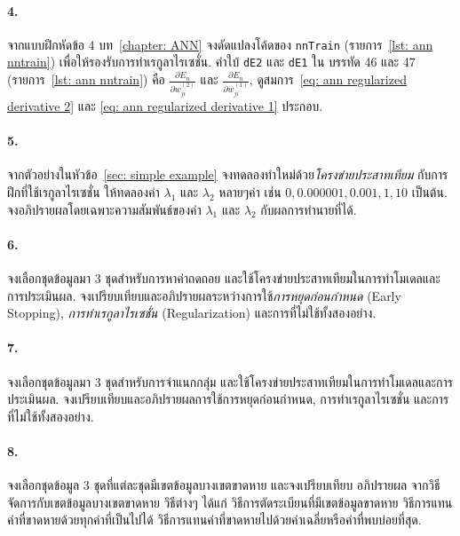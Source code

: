 \paragraph{4.}
จากแบบฝึกหัดข้อ 4 บท~\ref{chapter: ANN} จงดัดแปลงโค้ดของ \texttt{nnTrain} (รายการ~\ref{lst: ann nntrain}) เพื่อให้รองรับการทำเรกูลาไรเซชั่น.
คำใบ้ \texttt{dE2} และ \texttt{dE1} ใน บรรทัด 46 และ 47 (รายการ~\ref{lst: ann nntrain}) คือ $\frac{\partial E_n}{\partial w_{ji}^{(2)}}$ และ $\frac{\partial E_n}{\partial w_{ji}^{(1)}}$, ดูสมการ~\ref{eq: ann regularized derivative 2} และ \ref{eq: ann regularized derivative 1} ประกอบ.

\paragraph{5.}
จากตัวอย่างในหัวข้อ~\ref{sec: simple example} จงทดลองทำใหม่ด้วย\textit{โครงข่ายประสาทเทียม}%
กับการฝึกที่ใช้เรกูลาไรเซชั่น ให้ทดลองค่า $\lambda_1$ และ $\lambda_2$ หลายๆค่า เช่น $0, 0.000001, 0.001, 1, 10$ เป็นต้น.
จงอภิปรายผลโดยเฉพาะความสัมพันธ์ของค่า $\lambda_1$ และ $\lambda_2$ กับผลการทำนายที่ได้.

\paragraph{6.} 
จงเลือกชุดข้อมูลมา $3$ ชุดสำหรับการหาค่าถดถอย 
และใช้โครงข่ายประสาทเทียมในการทำโมเดลและการประเมินผล.
จงเปรียบเทียบและอภิปรายผลระหว่างการใช้\textit{การหยุดก่อนกำหนด} (Early Stopping), \textit{การทำเรกูลาไรเซชั่น} (Regularization) และการที่ไม่ใช้ทั้งสองอย่าง.

\paragraph{7.} 
จงเลือกชุดข้อมูลมา $3$ ชุดสำหรับการจำแนกกลุ่ม
และใช้โครงข่ายประสาทเทียมในการทำโมเดลและการประเมินผล.
จงเปรียบเทียบและอภิปรายผลการใช้การหยุดก่อนกำหนด, การทำเรกูลาไรเซชั่น และการที่ไม่ใช้ทั้งสองอย่าง.

\paragraph{8.} 
จงเลือกชุดข้อมูล $3$ ชุดที่แต่ละชุดมีเขตข้อมูลบางเขตขาดหาย
และจงเปรียบเทียบ อภิปรายผล จากวิธีจัดการกับเขตข้อมูลบางเขตขาดหาย วิธีต่างๆ ได้แก่ 
วิธีการตัดระเบียนที่มีเขตข้อมูลขาดหาย 
วิธีการแทนค่าที่ขาดหายด้วยทุกค่าที่เป็นไปได้
วิธีการแทนค่าที่ขาดหายไปด้วยค่าเฉลี่ยหรือค่าที่พบบ่อยที่สุด.

